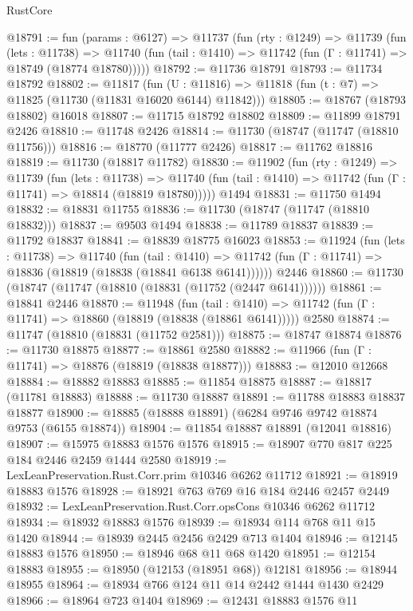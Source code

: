 \begin{lexlean}{RustCore}
\begin{coremodule}
@18791 := fun (params : @6127) =>
  @11737
    (fun (rty : @1249) =>
    @11739
      (fun (lets : @11738) =>
      @11740 (fun (tail : @1410) => @11742 (fun (Γ : @11741) => @18749 (@18774 @18780)))))
@18792 := @11736 @18791
@18793 := @11734 @18792
@18802 := @11817
    (fun (U : @11816) => @11818 (fun (t : @7) => @11825 (@11730 (@11831 @16020 @6144) @11842)))
@18805 := @18767 (@18793 @18802) @16018
@18807 := @11715 @18792 @18802
@18809 := @11899 @18791 @2426
@18810 := @11748 @2426
@18814 := @11730 (@18747 (@11747 (@18810 @11756)))
@18816 := @18770 (@11777 @2426)
@18817 := @11762 @18816
@18819 := @11730 (@18817 @11782)
@18830 := @11902
    (fun (rty : @1249) =>
    @11739
      (fun (lets : @11738) =>
      @11740 (fun (tail : @1410) => @11742 (fun (Γ : @11741) => @18814 (@18819 @18780)))))
    @1494
@18831 := @11750 @1494
@18832 := @18831 @11755
@18836 := @11730 (@18747 (@11747 (@18810 @18832)))
@18837 := @9503 @1494
@18838 := @11789 @18837
@18839 := @11792 @18837
@18841 := @18839 @18775 @16023
@18853 := @11924
    (fun (lets : @11738) =>
    @11740
      (fun (tail : @1410) =>
      @11742 (fun (Γ : @11741) => @18836 (@18819 (@18838 (@18841 @6138 @6141))))))
    @2446
@18860 := @11730 (@18747 (@11747 (@18810 (@18831 (@11752 (@2447 @6141))))))
@18861 := @18841 @2446
@18870 := @11948
    (fun (tail : @1410) => @11742 (fun (Γ : @11741) => @18860 (@18819 (@18838 (@18861 @6141)))))
    @2580
@18874 := @11747 (@18810 (@18831 (@11752 @2581)))
@18875 := @18747 @18874
@18876 := @11730 @18875
@18877 := @18861 @2580
@18882 := @11966 (fun (Γ : @11741) => @18876 (@18819 (@18838 @18877)))
@18883 := @12010 @12668
@18884 := @18882 @18883
@18885 := @11854 @18875
@18887 := @18817 (@11781 @18883)
@18888 := @11730 @18887
@18891 := @11788 @18883 @18837 @18877
@18900 := @18885 (@18888 @18891) (@6284 @9746 @9742 @18874 @9753 (@6155 @18874))
@18904 := @11854 @18887 @18891 (@12041 @18816)
@18907 := @15975 @18883 @1576 @1576
@18915 := @18907 @770 @817 @225 @184 @2446 @2459 @1444 @2580
@18919 := LexLeanPreservation.Rust.Corr.prim @10346 @6262 @11712
@18921 := @18919 @18883 @1576
@18928 := @18921 @763 @769 @16 @184 @2446 @2457 @2449
@18932 := LexLeanPreservation.Rust.Corr.opsCons @10346 @6262 @11712
@18934 := @18932 @18883 @1576
@18939 := @18934 @114 @768 @11 @15 @1420
@18944 := @18939 @2445 @2456 @2429 @713 @1404
@18946 := @12145 @18883 @1576
@18950 := @18946 @68 @11 @68 @1420
@18951 := @12154 @18883
@18955 := @18950 (@12153 (@18951 @68)) @12181
@18956 := @18944 @18955
@18964 := @18934 @766 @124 @11 @14 @2442 @1444 @1430 @2429
@18966 := @18964 @723 @1404
@18969 := @12431 @18883 @1576 @11

\end{coremodule}
\end{lexlean}
